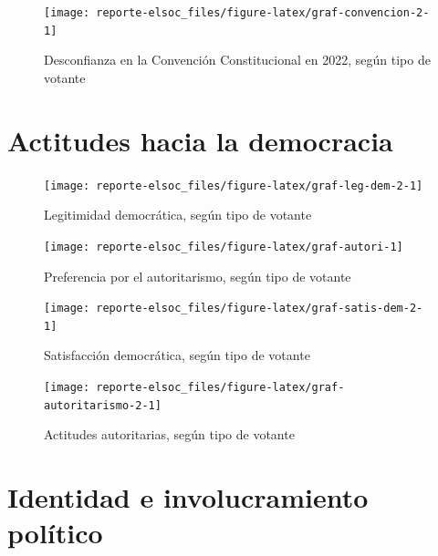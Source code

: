 \documentclass[
  12pt,
]{book}
\begin{document}
\begin{figure}

{\centering \texttt{[image: reporte-elsoc\_files/figure-latex/graf-convencion-2-1]} 

}

\caption{Desconfianza en la Convención Constitucional en 2022, según tipo de votante}\label{fig:graf-convencion-2}
\end{figure}

\hypertarget{actitudes-hacia-la-democracia}{%
\section{Actitudes hacia la democracia}\label{actitudes-hacia-la-democracia}}

\begin{figure}

{\centering \texttt{[image: reporte-elsoc\_files/figure-latex/graf-leg-dem-2-1]} 

}

\caption{Legitimidad democrática, según tipo de votante}\label{fig:graf-leg-dem-2}
\end{figure}

\begin{figure}

{\centering \texttt{[image: reporte-elsoc\_files/figure-latex/graf-autori-1]} 

}

\caption{Preferencia por el autoritarismo, según tipo de votante}\label{fig:graf-autori}
\end{figure}

\begin{figure}

{\centering \texttt{[image: reporte-elsoc\_files/figure-latex/graf-satis-dem-2-1]} 

}

\caption{Satisfacción democrática, según tipo de votante}\label{fig:graf-satis-dem-2}
\end{figure}

\begin{figure}

{\centering \texttt{[image: reporte-elsoc\_files/figure-latex/graf-autoritarismo-2-1]} 

}

\caption{Actitudes autoritarias, según tipo de votante}\label{fig:graf-autoritarismo-2}
\end{figure}

\hypertarget{identidad-e-involucramiento-poluxedtico}{%
\section{Identidad e involucramiento político}\label{identidad-e-involucramiento-poluxedtico}}
\end{document}
